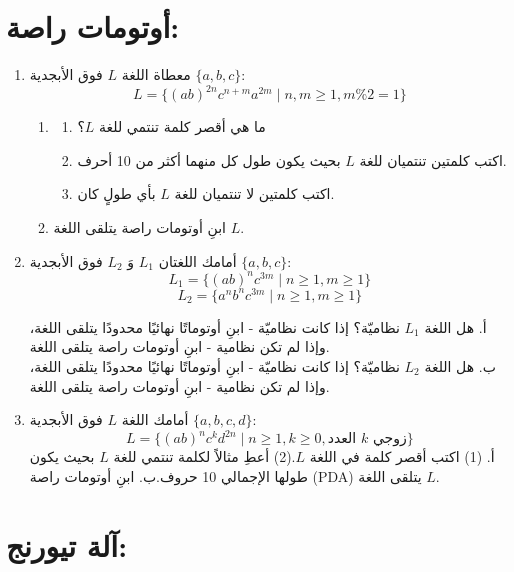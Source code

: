 \documentclass[14pt]{extarticle}
\begin{document}
\clearpage
\section*{أوتومات راصة:}
    \begin{enumerate}
        \item
        معطاة اللغة $L$ فوق الأبجدية $\{a, b, c\}$:
        $$L = \{ (ab)^{2n} c^{n+m} a^{2m} \mid n,m \ge 1, m\%2=1 \}$$
        \begin{enumerate}[label=\alph*.]
        \item
        \begin{enumerate}[label=(\arabic*)]
        \item ما هي أقصر كلمة تنتمي للغة $L$؟
        \item اكتب كلمتين تنتميان للغة $L$ بحيث يكون طول كل منهما أكثر من 10 أحرف.
        \item اكتب كلمتين لا تنتميان للغة $L$ بأي طولٍ كان.
        \end{enumerate}
        \item
        ابنِ أوتومات راصة يتلقى اللغة $L$.
        \end{enumerate}

        \item
        أمامك اللغتان $L_1$ وَ $L_2$ فوق الأبجدية $\{a, b, c\}$:
        $$L_1 = \{ (ab)^n c^{3m} \mid n \ge 1, m \ge 1 \}$$
        $$L_2 = \{ a^n b^n c^{3m} \mid n \ge 1, m \ge 1 \}$$

        أ. هل اللغة $L_1$ نظاميّة؟ إذا كانت نظاميّة - ابنِ أوتوماتًا نهائيًا محدودًا يتلقى اللغة، وإذا لم تكن نظامية - ابنِ أوتومات راصة يتلقى اللغة. \\
        ب. هل اللغة $L_2$ نظاميّة؟ إذا كانت نظاميّة - ابنِ أوتوماتًا نهائيًا محدودًا يتلقى اللغة، وإذا لم تكن نظامية - ابنِ أوتومات راصة يتلقى اللغة.

        \item
        أمامك اللغة $L$ فوق الأبجدية $\{a, b, c, d\}$:$$L = \{ (ab)^n c^k d^{2n} \mid n \ge 1, k \ge 0, \text{العدد } k \text{ زوجي} \}$$أ. (1) اكتب أقصر كلمة في اللغة $L$.(2) أعطِ مثالاً لكلمة تنتمي للغة $L$ بحيث يكون طولها الإجمالي 10 حروف.ب. ابنِ أوتومات راصة (PDA) يتلقى اللغة $L$.

    \end{enumerate}

    \clearpage
\section*{آلة تيورنج:}
\end{document}
